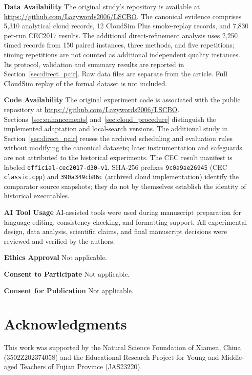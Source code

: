 \documentclass[pdflatex,onecolumn,sn-mathphys-num]{sn-jnl}
\begin{document}
\textbf{Data Availability} The original study's repository is available at \url{https://github.com/Lazywords2006/LSCBO}. The canonical evidence comprises 5,310 analytical cloud records, 12 CloudSim Plus smoke-replay records, and 7,830 per-run CEC2017 results. The additional direct-refinement analysis uses 2,250 timed records from 150 paired instances, three methods, and five repetitions; timing repetitions are not counted as additional independent quality instances. Its protocol, validation and summary results are reported in Section~\ref{sec:direct_pair}. Raw data files are separate from the article. Full CloudSim replay of the formal dataset is not included.

\textbf{Code Availability} The original experiment code is associated with the public repository at \url{https://github.com/Lazywords2006/LSCBO}. Sections~\ref{sec:enhancements} and~\ref{sec:cloud_procedure} distinguish the implemented adaptation and local-search versions. The additional study in Section~\ref{sec:direct_pair} reuses the archived scheduling and evaluation rules without modifying the canonical datasets; later instrumentation and safeguards are not attributed to the historical experiments. The CEC result manifest is labeled \texttt{official-cec2017-d30-v1}. SHA-256 prefixes \texttt{9c0a9ae26945} (CEC \texttt{classic.cpp}) and \texttt{390a349cb86c} (archived cloud implementation) identify the comparator source snapshots; they do not by themselves establish the identity of historical executables.


\textbf{AI Tool Usage} AI-assisted tools were used during manuscript preparation for language editing, consistency checking, and formatting support. All experimental design, data analysis, scientific claims, and final manuscript decisions were reviewed and verified by the authors.

\textbf{Ethics Approval} Not applicable.

\textbf{Consent to Participate} Not applicable.

\textbf{Consent for Publication} Not applicable.

\section*{Acknowledgments}
This work was supported by the Natural Science Foundation of Xiamen, China (3502Z202374058) and the Educational Research Project for Young and Middle-aged Teachers of Fujian Province (JAS23220).
\end{document}
